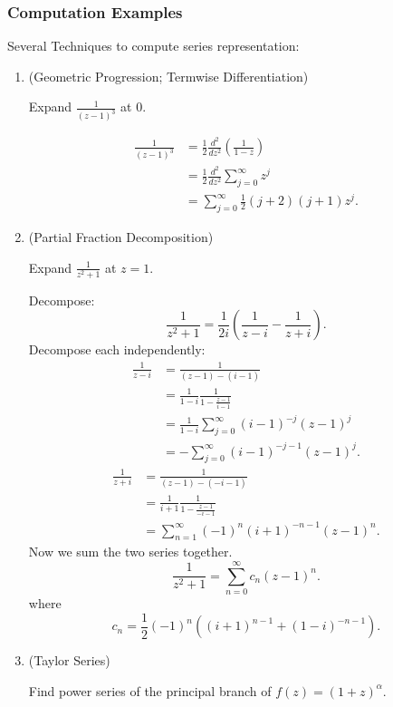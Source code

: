 \subsubsection{Computation Examples}
Several Techniques to compute series representation:
\begin{enumerate}
	\item (Geometric Progression; Termwise Differentiation)
		\begin{example}
			Expand $\frac{1}{\left( z-1 \right)^3 }$ at $0$.

			\begin{align*}
				\frac{1}{\left( z-1  \right) ^3}
				&= \frac{1}{2} \frac{d^2}{dz^2}\left( \frac{1}{1-z} \right)  \\
				&= \frac{1}{2}\frac{d^2}{dz^2}\sum_{j=0}^{\infty} z^j \\
				&= \sum_{j=0}^{\infty} \frac{1}{2}(j+2)(j+1)z^j
			.\end{align*}
		\end{example}
	\item (Partial Fraction Decomposition)
		\begin{example}
			Expand $\frac{1}{z^2 + 1}$ at $z=1$.

			Decompose:
			\[
				\frac{1}{z^2 + 1} = \frac{1}{2 i}\left( \frac{1}{z-i} - \frac{1}{z+i} \right) 
			.\] 
			Decompose each independently:
			\begin{align*}
				\frac{1}{z-i} &= \frac{1}{(z-1) - (i-1)} \\
				&= \frac{1}{1-i} \frac{1}{1- \frac{z-1}{i-1}} \\
				&= \frac{1}{1-i} \sum_{j=0}^{\infty} (i-1)^{-j}(z-1)^j \\
				&= - \sum_{j=0}^{\infty} (i-1)^{-j-1} (z-1)^j 
			.\end{align*}
			\begin{align*}
				\frac{1}{z+i} &= \frac{1}{(z-1) - (-i-1)}\\
				&= \frac{1}{i+1} \frac{1}{1 - \frac{z-1}{-i-1}} \\
				&= \sum_{n=1}^{\infty} (-1)^n (i+1)^{-n-1} (z-1)^n
			.\end{align*}
			Now we sum the two series together.
			\[
				\frac{1}{z^2 + 1} = \sum_{n=0}^{\infty} c_n (z-1)^n
			.\] 
			where 
			\[
				c_n = \frac{1}{2} (-1)^n \left( (i+1)^{n-1} + (1-i)^{-n-1}\right) 
			.\] 
		\end{example}
	\item (Taylor Series)
		\begin{example}
			Find power series of the principal branch of $f(z) = (1+z)^{\alpha}$.


\end{example}
\end{enumerate}
